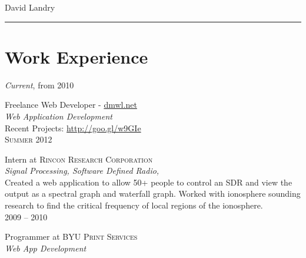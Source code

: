 \documentclass[10pt]{article}
\begin{document}
\color{text1} %

	\par{\centering
		{\sffamily\Large David Landry
      \vspace{10pt}
	}\\	
{\color{white} \hrule} %
	
\begin{minipage}[t]{0.5\textwidth} %

	
\section{Work Experience}

	\raggedleft
	\emph{Current}, from \textsc{2010}\par

	\raggedright\large Freelance Web Developer - \href{http://dmwl.net}{dmwl.net} \\
	\emph{Web Application Development}\\[5pt]

  \normalsize{
  Recent Projects: \href{http://goo.gl/w9GIe}{http://goo.gl/w9GIe}
  }\\[10pt]

	\raggedleft
	\textsc{\normalsize Summer 2012}\par

	\raggedright
	\large Intern at \textsc{Rincon Research Corporation}\\
  \emph{Signal Processing, Software Defined Radio,  }\\[5pt]

  \normalsize{
    Created a web application to allow 50+ people to control an SDR and view
      the output as a spectral graph and waterfall graph.
    Worked with ionosphere sounding research to find the critical frequency
      of local regions of the ionosphere.
  }\\[10pt]

	\raggedleft
	\textsc{\normalsize 2009 -- 2010}\par

	\raggedright
	\large Programmer at \textsc{BYU Print Services}\\
  \emph{Web App Development}\\[5pt]


\end{minipage}}
\end{document}
